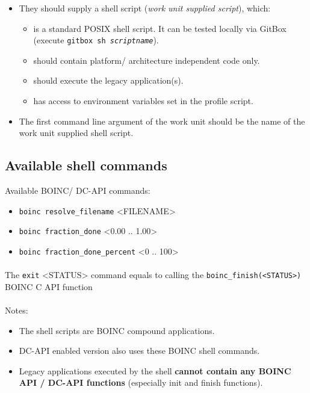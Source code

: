 \documentclass[a4paper,12pt,titlepage,dvipdfm]{article}
\begin{document}
\begin{itemize}
    \item They should supply a shell script (\emph{work unit supplied script}), which:
        \begin{itemize}
            \item is a standard POSIX shell script. It can be tested locally via GitBox (execute \texttt{gitbox sh \emph{scriptname}}).
            \item should contain platform/ architecture independent code only.
            \item should execute the legacy application(s).
            \item has access to environment variables set in the profile script.
        \end{itemize}
    \item The first command line argument of the work unit should be the name of the work unit supplied shell script.
\end{itemize}

\subsection{Available shell commands}

Available BOINC/ DC-API commands:
\begin{itemize}
    \item \texttt{boinc resolve\_filename} <FILENAME>
    \item \texttt{boinc fraction\_done} <0.00 .. 1.00>
    \item \texttt{boinc fraction\_done\_percent} <0 .. 100>
\end{itemize}

\paragraph*{} The \texttt{exit} <STATUS> command equals to calling the \texttt{boinc\_finish(<STATUS>)} BOINC C API function

\paragraph*{} Notes:
\begin{itemize}
    \item The shell scripts are BOINC compound applications. 
    \item DC-API enabled version also uses these BOINC shell commands.
    \item Legacy applications executed by the shell \textbf{cannot contain any BOINC API / DC-API functions} (especially init and finish functions).
     
\end{itemize}
\end{document}
